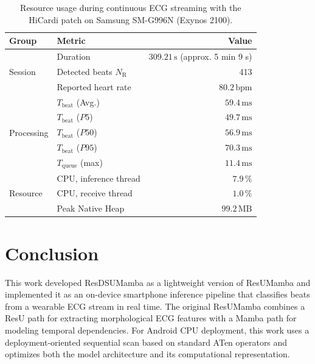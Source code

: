 \begin{table}[t]
\centering
\caption[Resource usage during continuous ECG streaming.]{Resource usage during continuous ECG streaming with the HiCardi patch on Samsung SM-G996N (Exynos 2100).}
\label{tab:live_profile}
\small
\begin{tabular}{@{}llr@{}}
\toprule
Group & Metric & Value \\
\midrule
\multirow{3}{*}{Session}
& Duration & $309.21\,\mathrm{s}$ (approx. 5 min 9 s) \\
& Detected beats $N_{\mathrm{R}}$ & 413 \\
& Reported heart rate & $80.2\,\mathrm{bpm}$ \\
\midrule
\multirow{5}{*}{Processing}
& $T_{\mathrm{beat}}$ (Avg.) & $59.4\,\mathrm{ms}$ \\
& $T_{\mathrm{beat}}$ ($P5$) & $49.7\,\mathrm{ms}$ \\
& $T_{\mathrm{beat}}$ ($P50$) & $56.9\,\mathrm{ms}$ \\
& $T_{\mathrm{beat}}$ ($P95$) & $70.3\,\mathrm{ms}$ \\
& $T_{\mathrm{queue}}$ (max) & $11.4\,\mathrm{ms}$ \\
\midrule
\multirow{3}{*}{Resource}
& CPU, inference thread & $7.9\,\%$ \\
& CPU, receive thread & $1.0\,\%$ \\
& Peak Native Heap & $99.2\,\mathrm{MB}$ \\
\bottomrule
\end{tabular}
\end{table}


\chapter{Conclusion} \label{ch:conclusion}
 
This work developed ResDSUMamba as a lightweight version of ResUMamba and implemented it as an on-device smartphone inference pipeline that classifies beats from a wearable ECG stream in real time.
The original ResUMamba combines a ResU path for extracting morphological ECG features with a Mamba path for modeling temporal dependencies.
For Android CPU deployment, this work uses a deployment-oriented sequential scan based on standard ATen operators and optimizes both the model architecture and its computational representation.
 
